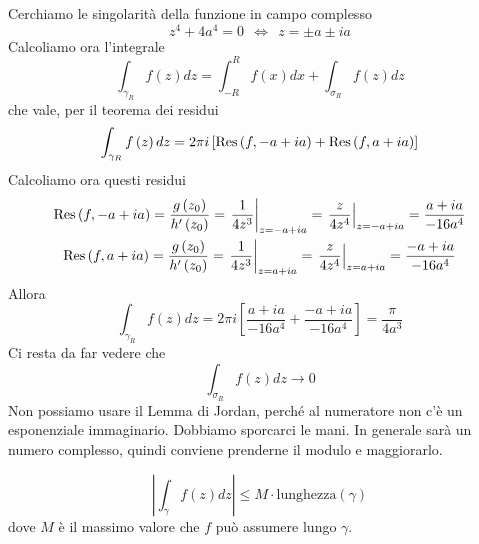 \begin{figure}[htpb]
\end{figure}
\FloatBarrier

Cerchiamo le singolarità della funzione in campo complesso
\begin{equation*}
z^{4} + 4a^{4} = 0\ \ \iff \ \ z = \pm a\pm ia
\end{equation*}
Calcoliamo ora l'integrale
\begin{equation*}
\int_{\gamma_{R}} f\left(z\right) dz = \int^{R}_{- R} f\left(x\right) dx + \int_{\sigma_{R}} f\left(z\right) dz
\end{equation*}
che vale, per il teorema dei residui
\begin{equation*}
\int_{\gamma_{R}} f\left(z\right) dz = 2\pi i\left[\operatorname{Res} \left(f, - a + ia\right) + \operatorname{Res} \left(f, a + ia\right)\right]
\end{equation*}
Calcoliamo ora questi residui
\begin{gather*}
\operatorname{Res} \left(f, - a + ia\right) = \frac{g\left(z_{0}\right)}{h'\left(z_{0}\right)} = \left. \frac{1}{4z^{3}}\right|_{z = -a + ia} = \left. \frac{z}{4z^{4}}\right|_{z = -a + ia} = \frac{a + ia}{- 16a^{4}}\\
\operatorname{Res} \left(f, a + ia\right) = \frac{g\left(z_{0}\right)}{h'\left(z_{0}\right)} = \left. \frac{1}{4z^{3}}\right|_{z = a + ia} = \left. \frac{z}{4z^{4}}\right|_{z = a + ia} = \frac{- a + ia}{- 16a^{4}}
\end{gather*}
Allora
\begin{equation*}
\int_{\gamma_{R}} f\left(z\right) dz = 2\pi i\left[\frac{a + ia}{- 16a^{4}} + \frac{- a + ia}{- 16a^{4}}\right] = \frac{\pi}{4a^{3}}
\end{equation*}
Ci resta da far vedere che
\begin{equation*}
\int_{\sigma_{R}} f\left(z\right) dz\rightarrow 0
\end{equation*}
Non possiamo usare il Lemma di Jordan, perché al numeratore non c'è un esponenziale immaginario. Dobbiamo sporcarci le mani. In generale sarà un numero complesso, quindi conviene prenderne il modulo e maggiorarlo.
\begin{rem}
\begin{equation*}
\left| \int_{\gamma} f\left(z\right) dz\right| \leq M \cdot \text{lunghezza}\left(\gamma \right)
\end{equation*}
dove $M$ è il massimo valore che $f$ può assumere lungo $\gamma $.
\end{rem}
